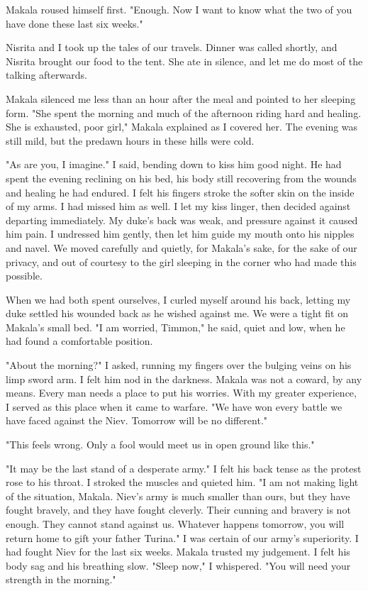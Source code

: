 \documentclass{article}
\begin{document}
Makala roused himself first. "Enough. Now I want to know what the two of you have done these last six weeks."

Nisrita and I took up the tales of our travels. Dinner was called shortly, and Nisrita brought our food to the tent. She ate in silence, and let me do most of the talking afterwards. 

Makala silenced me less than an hour after the meal and pointed to her sleeping form. "She spent the morning and much of the afternoon riding hard and healing. She is exhausted, poor girl," Makala explained as I covered her. The evening was still mild, but the predawn hours in these hills were cold.

"As are you, I imagine." I said, bending down to kiss him good night. He had spent the evening reclining on his bed, his body still recovering from the wounds and healing he had endured. I felt his fingers stroke the softer skin on the inside of my arms. I had missed him as well. I let my kiss linger, then decided against departing immediately. My duke's back was weak, and pressure against it caused him pain. I undressed him gently, then let him guide my mouth onto his nipples and navel. We moved carefully and quietly, for Makala's sake, for the sake of our privacy, and out of courtesy to the girl sleeping in the corner who had made this possible. 

When we had both spent ourselves, I curled myself around his back, letting my duke settled his wounded back as he wished against me. We were a tight fit on Makala's small bed. "I am worried, Timmon," he said, quiet and low, when he had found a comfortable position. 

"About the morning?" I asked, running my fingers over the bulging veins on his limp sword arm. I felt him nod in the darkness. Makala was not a coward, by any means. Every man needs a place to put his worries. With my greater experience, I served as this place when it came to warfare. "We have won every battle we have faced against the Niev. Tomorrow will be no different."

"This feels wrong. Only a fool would meet us in open ground like this."

"It may be the last stand of a desperate army." I felt his back tense as the protest rose to his throat. I stroked the muscles and quieted him. "I am not making light of the situation, Makala. Niev's army is much smaller than ours, but they have fought bravely, and they have fought cleverly. Their cunning and bravery is not enough. They cannot stand against us. Whatever happens tomorrow, you will return home to gift your father Turina." I was certain of our army's superiority. I had fought Niev for the last six weeks. Makala trusted my judgement. I felt his body sag and his breathing slow. "Sleep now," I whispered. "You will need your strength in the morning."
\end{document}
